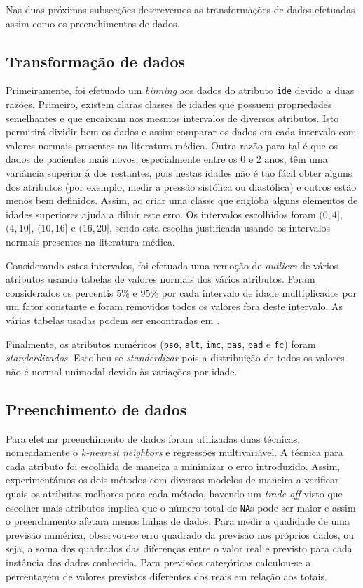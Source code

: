 \documentclass[10pt, conference, compsocconf]{IEEEtran}
\begin{document}
Nas duas próximas subsecções descrevemos as transformações de dados
efetuadas assim como os preenchimentos de dados.


\subsection{Transformação de dados}

Primeiramente, foi efetuado um \textit{binning} aos dados do atributo
{\tt ide} devido a duas razões. Primeiro, existem claras classes de
idades que possuem propriedades semelhantes e que encaixam nos mesmos
intervalos de diversos atributos. Isto permitirá dividir bem os dados
e assim comparar os dados em cada intervalo com valores normais
presentes na literatura médica. Outra razão para tal é que os dados de
pacientes mais novos, especialmente entre os 0 e 2 anos, têm uma
variância superior à dos restantes, pois nestas idades não é tão fácil
obter alguns dos atributos (por exemplo, medir a pressão sistólica ou
diastólica) e outros estão menos bem definidos. Assim, ao criar uma
classe que engloba alguns elementos de idades superiores ajuda a
diluir este erro. Os intervalos escolhidos foram $(0,4]$, $(4,10]$,
$(10,16]$ e $(16,20]$, sendo esta escolha justificada usando os
intervalos normais presentes na literatura médica.

Considerando estes intervalos, foi efetuada uma remoção de
\textit{outliers} de vários atributos usando tabelas de valores
normais dos vários atributos. Foram considerados os percentis $5\%$ e
$95\%$ por cada intervalo de idade multiplicados por um fator
constante e foram removidos todos os valores fora deste intervalo. As
várias tabelas usadas podem ser encontradas em
\cite{cdca,cdcb,rnceus,emedicine}.

Finalmente, os atributos numéricos ({\tt pso}, {\tt alt}, {\tt imc},
{\tt pas}, {\tt pad} e {\tt fc}) foram
\textit{standerdizados}. Escolheu-se \textit{standerdizar} pois a
distribuição de todos os valores não é normal unimodal devido às
variações por idade.


\subsection{Preenchimento de dados}
Para efetuar preenchimento de dados foram utilizadas duas técnicas,
nomeadamente o \textit{k-nearest neighbors} e regressões
multivariável. A técnica para cada atributo foi escolhida de maneira a
minimizar o erro introduzido. Assim, experimentámos os dois métodos
com diversos modelos de maneira a verificar quais os atributos
melhores para cada método, havendo um \textit{trade-off} visto que
escolher mais atributos implica que o número total de {\tt NA}s pode
ser maior e assim o preenchimento afetara menos linhas de dados. Para
medir a qualidade de uma previsão numérica, observou-se erro quadrado
da previsão nos próprios dados, ou seja, a soma dos quadrados das
diferenças entre o valor real e previsto para cada instância dos dados
conhecida. Para previsões categóricas calculou-se a percentagem de
valores previstos diferentes dos reais em relação aos totais.
\end{document}
